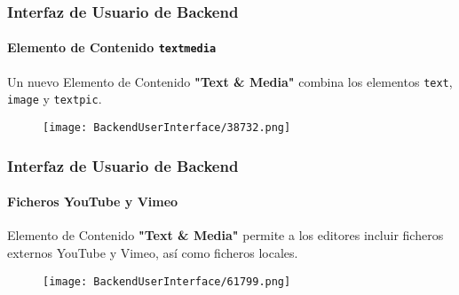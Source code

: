 \begin{frame}[fragile]
	\frametitle{Interfaz de Usuario de Backend}
	\framesubtitle{Elemento de Contenido \texttt{textmedia}}

	Un nuevo Elemento de Contenido \textbf{"Text \& Media"} combina los elementos
	\texttt{text}, \texttt{image} y \texttt{textpic}.

	\begin{figure}
		\texttt{[image: BackendUserInterface/38732.png]}
	\end{figure}

\end{frame}

\begin{frame}[fragile]
	\frametitle{Interfaz de Usuario de Backend}
	\framesubtitle{Ficheros YouTube y Vimeo}

	Elemento de Contenido \textbf{"Text \& Media"} permite a los editores incluir ficheros externos
	YouTube y Vimeo, así como ficheros locales.

	\begin{figure}
		\texttt{[image: BackendUserInterface/61799.png]}
	\end{figure}

\end{frame}

